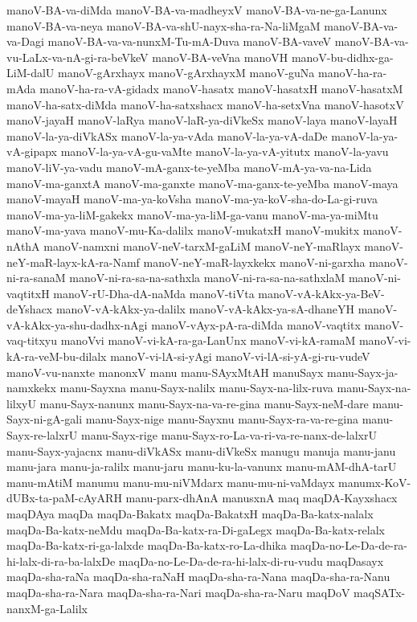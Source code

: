{manoV-BA-va-diMda
manoV-BA-va-madheyxV
manoV-BA-va-ne-ga-Lanunx
manoV-BA-va-neya
manoV-BA-va-shU-nayx-sha-ra-Na-liMgaM
manoV-BA-va-va-Dagi
manoV-BA-va-va-nunxM-Tu-mA-Duva
manoV-BA-vaveV
manoV-BA-va-vu-LaLx-va-nA-gi-ra-beVkeV
manoV-BA-veVna
manoVH
manoV-bu-didhx-ga-LiM-dalU
manoV-gArxhayx
manoV-gArxhayxM
manoV-guNa
manoV-ha-ra-mAda
manoV-ha-ra-vA-gidadx
manoV-hasatx
manoV-hasatxH
manoV-hasatxM
manoV-ha-satx-diMda
manoV-ha-satxshacx
manoV-ha-setxVna
manoV-hasotxV
manoV-jayaH
manoV-laRya
manoV-laR-ya-diVkeSx
manoV-laya
manoV-layaH
manoV-la-ya-diVkASx
manoV-la-ya-vAda
manoV-la-ya-vA-daDe
manoV-la-ya-vA-gipapx
manoV-la-ya-vA-gu-vaMte
manoV-la-ya-vA-yitutx
manoV-la-yavu
manoV-liV-ya-vadu
manoV-mA-ganx-te-yeMba
manoV-mA-ya-va-na-Lida
manoV-ma-ganxtA
manoV-ma-ganxte
manoV-ma-ganx-te-yeMba
manoV-maya
manoV-mayaH
manoV-ma-ya-koVsha
manoV-ma-ya-koV-sha-do-La-gi-ruva
manoV-ma-ya-liM-gakekx
manoV-ma-ya-liM-ga-vanu
manoV-ma-ya-miMtu
manoV-ma-yava
manoV-mu-Ka-dalilx
manoV-mukatxH
manoV-mukitx
manoV-nAthA
manoV-namxni
manoV-neV-tarxM-gaLiM
manoV-neY-maRlayx
manoV-neY-maR-layx-kA-ra-Namf
manoV-neY-maR-layxkekx
manoV-ni-garxha
manoV-ni-ra-sanaM
manoV-ni-ra-sa-na-sathxla
manoV-ni-ra-sa-na-sathxlaM
manoV-ni-vaqtitxH
manoV-rU-Dha-dA-naMda
manoV-tiVta
manoV-vA-kAkx-ya-BeV-deYshacx
manoV-vA-kAkx-ya-dalilx
manoV-vA-kAkx-ya-sA-dhaneYH
manoV-vA-kAkx-ya-shu-dadhx-nAgi
manoV-vAyx-pA-ra-diMda
manoV-vaqtitx
manoV-vaq-titxyu
manoVvi
manoV-vi-kA-ra-ga-LanUnx
manoV-vi-kA-ramaM
manoV-vi-kA-ra-veM-bu-dilalx
manoV-vi-lA-si-yAgi
manoV-vi-lA-si-yA-gi-ru-vudeV
manoV-vu-nanxte
manonxV
manu
manu-SAyxMtAH
manuSayx
manu-Sayx-ja-namxkekx
manu-Sayxna
manu-Sayx-nalilx
manu-Sayx-na-lilx-ruva
manu-Sayx-na-lilxyU
manu-Sayx-nanunx
manu-Sayx-na-va-re-gina
manu-Sayx-neM-dare
manu-Sayx-ni-gA-gali
manu-Sayx-nige
manu-Sayxnu
manu-Sayx-ra-va-re-gina
manu-Sayx-re-lalxrU
manu-Sayx-rige
manu-Sayx-ro-La-va-ri-va-re-nanx-de-lalxrU
manu-Sayx-yajacnx
manu-diVkASx
manu-diVkeSx
manugu
manuja
manu-janu
manu-jara
manu-ja-ralilx
manu-jaru
manu-ku-la-vanunx
manu-mAM-dhA-tarU
manu-mAtiM
manumu
manu-mu-niVMdarx
manu-mu-ni-vaMdayx
manumx-KoV-dUBx-ta-paM-cAyARH
manu-parx-dhAnA
manusxnA
maq
maqDA-Kayxshacx
maqDAya
maqDa
maqDa-Bakatx
maqDa-BakatxH
maqDa-Ba-katx-nalalx
maqDa-Ba-katx-neMdu
maqDa-Ba-katx-ra-Di-gaLegx
maqDa-Ba-katx-relalx
maqDa-Ba-katx-ri-ga-lalxde
maqDa-Ba-katx-ro-La-dhika
maqDa-no-Le-Da-de-ra-hi-lalx-di-ra-ba-lalxDe
maqDa-no-Le-Da-de-ra-hi-lalx-di-ru-vudu
maqDasayx
maqDa-sha-raNa
maqDa-sha-raNaH
maqDa-sha-ra-Nana
maqDa-sha-ra-Nanu
maqDa-sha-ra-Nara
maqDa-sha-ra-Nari
maqDa-sha-ra-Naru
maqDoV
maqSATx-nanxM-ga-Lalilx
}
